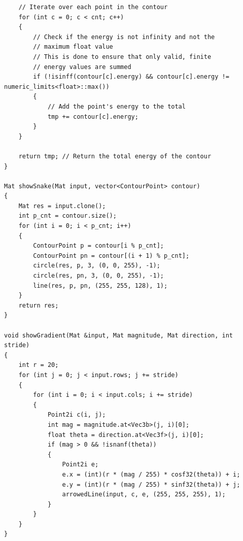 \documentclass[12pt,a4paper]{report}
\begin{document}
\begin{lstlisting}
    // Iterate over each point in the contour
    for (int c = 0; c < cnt; c++)
    {
        // Check if the energy is not infinity and not the
        // maximum float value
        // This is done to ensure that only valid, finite
        // energy values are summed
        if (!isinff(contour[c].energy) && contour[c].energy != numeric_limits<float>::max())
        {
            // Add the point's energy to the total
            tmp += contour[c].energy;
        }
    }

    return tmp; // Return the total energy of the contour
}

Mat showSnake(Mat input, vector<ContourPoint> contour)
{
    Mat res = input.clone();
    int p_cnt = contour.size();
    for (int i = 0; i < p_cnt; i++)
    {
        ContourPoint p = contour[i % p_cnt];
        ContourPoint pn = contour[(i + 1) % p_cnt];
        circle(res, p, 3, (0, 0, 255), -1);
        circle(res, pn, 3, (0, 0, 255), -1);
        line(res, p, pn, (255, 255, 128), 1);
    }
    return res;
}

void showGradient(Mat &input, Mat magnitude, Mat direction, int stride)
{
    int r = 20;
    for (int j = 0; j < input.rows; j += stride)
    {
        for (int i = 0; i < input.cols; i += stride)
        {
            Point2i c(i, j);
            int mag = magnitude.at<Vec3b>(j, i)[0];
            float theta = direction.at<Vec3f>(j, i)[0];
            if (mag > 0 && !isnanf(theta))
            {
                Point2i e;
                e.x = (int)(r * (mag / 255) * cosf32(theta)) + i;
                e.y = (int)(r * (mag / 255) * sinf32(theta)) + j;
                arrowedLine(input, c, e, (255, 255, 255), 1);
            }
        }
    }
}

\end{lstlisting}

\end{document}
